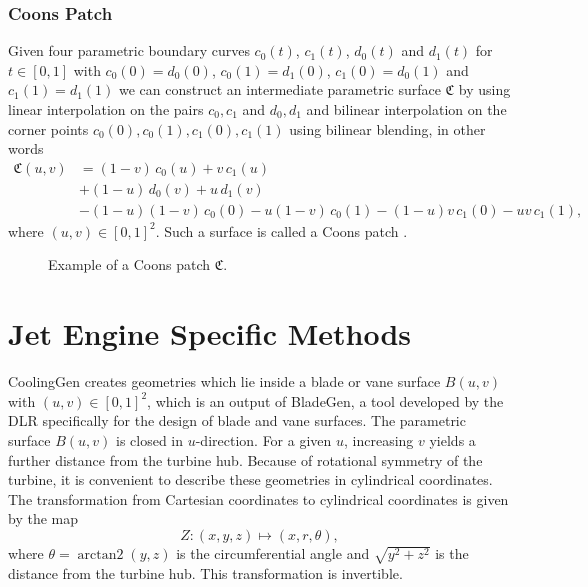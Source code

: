 \documentclass[a4paper, 11pt]{report}
\theoremstyle{definition}
\DeclareMathOperator{\arctantwo}{arctan2}
\begin{document}
\subsection{Coons Patch}\label{subsec:coons}
	Given four parametric boundary curves $c_0(t)$, $c_1(t)$, $d_0(t)$ and $d_1(t)$ for $t \in [0,1]$ with $c_0(0) = d_0(0)$, $c_0(1) = d_1(0)$, $c_1(0) = d_0(1)$ and $c_1(1) = d_1(1)$ we can construct an intermediate parametric surface $\mathfrak{C}$ by using linear interpolation on the pairs $c_0, c_1$ and $d_0, d_1$ and bilinear interpolation on the corner points $c_0(0), c_0(1), c_1(0), c_1(1)$ using bilinear blending, in other words
	\begin{align*}
		\mathfrak{C}(u,v) 	&= (1-v)\,c_0(u) + v\,c_1(u) \\
				&+ (1-u)\,d_0(v) + u\,d_1(v) \\
				&- (1-u)(1-v)\,c_0(0) - u(1-v)\,c_0(1)- (1-u)v\,c_1(0) - uv\,c_1(1),
	\end{align*}
	where $(u,v) \in [0,1]^2$. Such a surface is called a Coons patch \cite{Coons1967}. 

	\begin{figure}[H]
		\centering
		
		\caption{Example of a Coons patch $\mathfrak{C}$.}
	\end{figure}

\chapter{Jet Engine Specific Methods}\label{chap:jetenginespecifics}
	CoolingGen creates geometries which lie inside a blade or vane surface $B(u,v)$ with $(u,v) \in [0,1]^2$, which is an output of BladeGen, a tool developed by the DLR specifically for the design of blade and vane surfaces. The parametric surface $B(u,v)$ is closed in $u$-direction. For a given $u$, increasing $v$ yields a further distance from the turbine hub. Because of rotational symmetry of the turbine, it is convenient to describe these geometries in cylindrical coordinates. The transformation from Cartesian coordinates to cylindrical coordinates is given by the map
		\begin{equation}\label{eq:cylindrical_transformation} 
			Z: (x,y,z) \mapsto (x, r, \theta),
		\end{equation}
	where $\theta = \arctantwo(y, z)$ is the circumferential angle and $\sqrt{y^2+z^2}$ is the distance from the turbine hub. This transformation is invertible.
\end{document}
